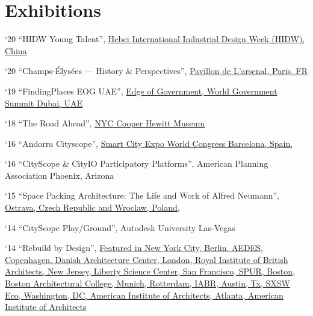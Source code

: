 \section*{Exhibitions}

\begin{tablist}

\item[`20] \tab \enquote{HIDW Young Talent},
\href{http://hidw-en.aty.cn/activity/Default.aspx?id=10000069}{Hebei International Industrial Design Week (HIDW), China}

\item[`20] \tab \enquote{Champs-Élysées — History \& Perspectives},
\href{https://www.pavillon-arsenal.com/en/expositions/11463-champs-elysees.html}{Pavillon de L'arsenal, Paris, FR}

\item[`19] \tab \enquote{FindingPlaces EOG UAE},
\href{https://edge.worldgovernmentsummit.org}{Edge of Government, World Government Summit Dubai, UAE}

\item[`18] \tab \enquote{The Road Ahead},
\href{https://www.cooperhewitt.org/channel/road-ahead/}{NYC Cooper Hewitt Museum}

\item[`16] \tab \enquote{Andorra Cityscope},
\href{https://www.actua.ad/en/actualitat/andorran-projects-attract-international-attention-smart-city-expo-world-congress}{Smart City Expo World Congress Barcelona, Spain,}

\item[`16] \tab \enquote{CityScope \& CityIO Participatory Platforms},
American Planning Association Phoenix, Arizona

\item[`15] \tab \enquote{Space Packing Architecture: The Life and Work of Alfred Neumann},
\href{https://www.archdaily.com/633053/space-packing-architecture-the-life-and-work-of-alfred-neumann?ad_medium=gallery}{Ostrava, Czech Republic and Wroclaw, Poland,}

\item[`14] \tab \enquote{CityScope Play/Ground},
Autodesk University Las-Vegas

\item[`14] \tab \enquote{Rebuild by Design},
\href{https://rebuildbydesign.org/news-and-events/exhibitions/rebuild-by-design-hurricane-sandy-design-competition/}{Featured in New York City, Berlin, AEDES,  Copenhagen, Danish Architecture Center, London, Royal Institute of British Architects, New Jersey, Liberty Science Center, San Francisco, SPUR, Boston, Boston Architectural College, Munich, Rotterdam, IABR, Austin, Tx, SXSW Eco, Washington, DC, American Institute of Architects, Atlanta, American Institute of Architects}


\end{tablist}
